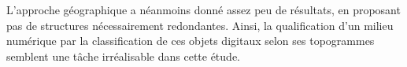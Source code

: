 L{\textquoteright}approche géographique a néanmoins donné assez peu de résultats, en proposant pas de structures nécessairement redondantes. Ainsi, la qualification d{\textquoteright}un milieu numérique par la classification de ces objets digitaux selon ses topogrammes semblent une t\^ache irréalisable dans cette étude. 


\lipsum[4-10]